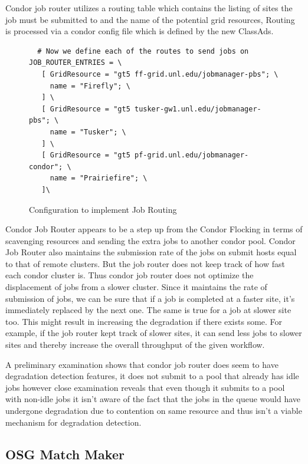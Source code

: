 \documentclass[ms,electronic,double]{nuthesis}
\begin{document}
Condor job router utilizes a routing table which contains the listing of sites 
the job must be submitted to and the name of the potential grid resources, Routing is processed via a  condor config file which is defined by the new ClassAds.

\begin{figure}
\begin{lstlisting}
  # Now we define each of the routes to send jobs on
JOB_ROUTER_ENTRIES = \
   [ GridResource = "gt5 ff-grid.unl.edu/jobmanager-pbs"; \
     name = "Firefly"; \
   ] \
   [ GridResource = "gt5 tusker-gw1.unl.edu/jobmanager-pbs"; \
     name = "Tusker"; \
   ] \
   [ GridResource = "gt5 pf-grid.unl.edu/jobmanager-condor"; \
     name = "Prairiefire"; \
   ]\

\end{lstlisting}
\caption{Configuration to implement Job Routing}
\end{figure}

Condor Job Router appears to be a step up from the Condor Flocking in terms of 
scavenging resources and sending the extra jobs to another condor pool. Condor 
Job Router also maintains the submission rate of the jobs on submit hosts equal to that of remote clusters. But the job 
router does not keep track of how fast each condor cluster is. Thus 
condor job router does not optimize the displacement of jobs from a slower 
cluster. Since it maintains the rate of submission of jobs, we can be sure that if a job is completed 
at a faster site, it's immediately replaced by the next one. The same is true for a job at slower site 
too.
This might result in increasing the degradation if there exists some. For example, if the job router kept track of slower sites, it
can send less jobs to slower sites and thereby increase the overall throughput of the given workflow.

A preliminary examination shows that condor job router does seem to have degradation detection features, 
it does not submit to a pool that already has idle jobs however close examination reveals that even though it
submits to a pool with non-idle jobs it isn't aware of the fact that the jobs in the queue would have 
undergone degradation due to contention on same resource and thus isn't a viable mechanism for degradation detection.

\subsection{OSG Match Maker}
\end{document}
